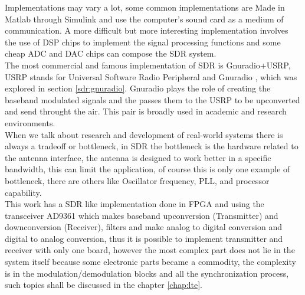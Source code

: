 Implementations may vary a lot, some common implementations are Made in Matlab
through Simulink and use the computer’s sound card as a medium of communication.
A more difficult but more interesting implementation involves the use of DSP
chips to implement the signal processing functions and some cheap ADC and DAC
chips can compose the SDR system.\\

 The most commercial and famous implementation of SDR is Gnuradio+USRP, USRP
stands for Universal Software Radio Peripheral \cite{web:usrp} and Gnuradio
\cite{web:gnuradio}, which was explored in section \ref{sdr:gnuradio}. Gnuradio
plays the role of creating the baseband modulated signals and the passes them
to the USRP to be upconverted and send throught the air. This pair is broadly
used in academic and research environments.\\

When we talk about research and development of real-world systems there is
always a tradeoff or bottleneck, in SDR the bottleneck is the hardware related
to the antenna interface, the antenna is designed to work better in a specific
bandwidth, this can limit the application, of course this is only one example of
bottleneck, there are others like Oscillator frequency, PLL, and processor
capability.\\

This work has a SDR like implementation done in FPGA and using the transceiver
AD9361 which makes baseband upconversion (Transmitter) and downconversion
(Receiver), filters and make analog to digital conversion and digital to analog
conversion, thus it is possible to implement transmitter and receiver with only
one board, however the most complex part does not lie in the system itself
because some electronic parts became a commodity, the complexity is in the
modulation/demodulation blocks and all the synchronization process, such topics
shall be discussed in the chapter \ref{chap:lte}.
